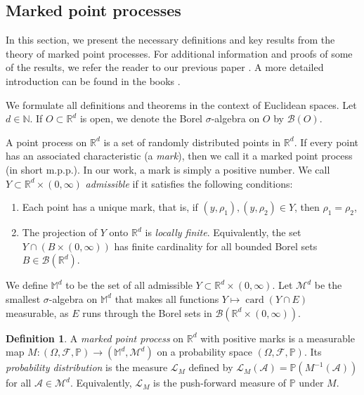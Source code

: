 \documentclass{article}
\numberwithin{equation}{section}
\theoremstyle{definition}
\newtheorem{definition}[theorem]{Definition}
\theoremstyle{remark}
\newcommand{\card}{\operatorname{card}}
\begin{document}
\subsection{Marked point processes} \label{ssec:mpp}

In this section, we present the necessary definitions and key results from the theory of marked point processes. For additional information and proofs of some of the results, we refer the reader to our previous paper \cite{B}. A more detailed introduction can be found in the books \cite{CSKM, DVJ}.

We formulate all definitions and theorems in the context of Euclidean spaces. Let $d \in \mathbb{N}$. If $O \subset \mathbb{R}^d$ is open, we denote the Borel $\sigma$-algebra on $O$ by $\mathcal{B}(O)$.

A point process on $\mathbb{R}^d$ is a set of randomly distributed points in $\mathbb{R}^d$. If every point has an associated characteristic (a \textit{mark}), then we call it a marked point process (in short m.p.p.). In our work, a mark is simply a positive number. We call $Y \subset \mathbb{R}^d \times (0, \infty)$ \textit{admissible} if it satisfies the following conditions:
\begin{enumerate}[label=(\roman*)]
    \item Each point has a unique mark, that is, if $(y, \rho_1), (y, \rho_2) \in Y$, then $\rho_1 = \rho_2$,
    \item The projection of $Y$ onto $\mathbb{R}^d$ is \textit{locally finite}. Equivalently, the set $Y \cap (B \times (0, \infty))$ has finite cardinality for all bounded Borel sets $B \in \mathcal{B}(\mathbb{R}^d)$.
\end{enumerate}
We define $\mathbb{M}^d$ to be the set of all admissible $Y \subset \mathbb{R}^d \times (0, \infty)$. Let $\mathcal{M}^d$ be the smallest $\sigma$-algebra on $\mathbb{M}^d$ that makes all functions $Y \mapsto \card(Y \cap E)$ measurable, as $E$ runs through the Borel sets in $\mathcal{B}(\mathbb{R}^d \times (0, \infty))$.

\begin{definition}
    A \textit{marked point process} on $\mathbb{R}^d$ with positive marks is a measurable map $M : (\Omega, \mathcal{F}, \mathbb{P}) \rightarrow (\mathbb{M}^d, \mathcal{M}^d)$ on a probability space $(\Omega, \mathcal{F}, \mathbb{P})$. Its \textit{probability distribution} is the measure $\mathcal{L}_M$ defined by $\mathcal{L}_M(\mathcal{A}) = \mathbb{P}(M^{-1}(\mathcal{A}))$ for all $\mathcal{A} \in \mathcal{M}^d$. Equivalently, $\mathcal{L}_M$ is the push-forward measure of $\mathbb{P}$ under $M$.
\end{definition}
\end{document}
